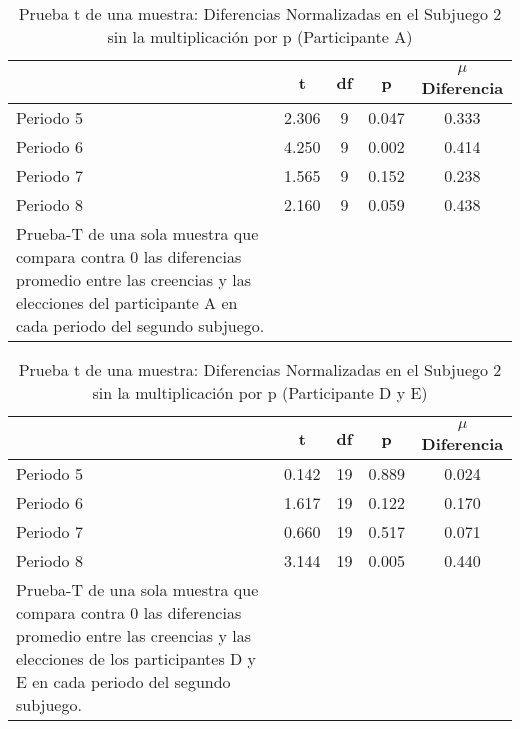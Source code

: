 \begin{table}[h]
\caption[Prueba t de una muestra: Diferencias Normalizadas en el Subjuego 2 sin la multiplicación por p (Participante A)]{Prueba t de una muestra: Diferencias Normalizadas en el Subjuego 2 sin la multiplicación por p (Participante A)}
\label{DN-S1}
\centering
\begin{tabular}{l | c c c | c}
\toprule
\textbf{} & \textbf{t} & \textbf{df} & \textbf{p} & \textbf{$\mu$Diferencia}\\
\midrule
Periodo 5 & 2.306 & 9 & 0.047 & 0.333\\
Periodo 6 & 4.250 & 9 & 0.002 & 0.414\\
Periodo 7 & 1.565 & 9 & 0.152 & 0.238\\
Periodo 8 & 2.160 & 9 & 0.059 & 0.438\\
\bottomrule
Prueba-T de una sola muestra que compara contra 0 las diferencias promedio entre las creencias y las elecciones del participante A en cada periodo del segundo subjuego.
\end{tabular}
\end{table}













\begin{table}[h]
\caption[Prueba t de una muestra: Diferencias Normalizadas en el Subjuego 2 sin la multiplicación por p (Participantes D y E)]{Prueba t de una muestra: Diferencias Normalizadas en el Subjuego 2 sin la multiplicación por p (Participante D y E)}
\label{DN-S1}
\centering
\begin{tabular}{l | c c c | c}
\toprule
\textbf{} & \textbf{t} & \textbf{df} & \textbf{p} & \textbf{$\mu$Diferencia}\\
\midrule
Periodo 5 & 0.142 & 19 & 0.889 & 0.024\\
Periodo 6 & 1.617 & 19 & 0.122 & 0.170\\
Periodo 7 & 0.660 & 19 & 0.517 & 0.071\\
Periodo 8 & 3.144 & 19 & 0.005 & 0.440\\
\bottomrule
Prueba-T de una sola muestra que compara contra 0 las diferencias promedio entre las creencias y las elecciones de los participantes D y E en cada periodo del segundo subjuego.
\end{tabular}
\end{table}













